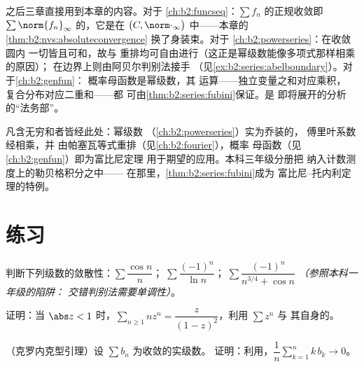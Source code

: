 \begin{remark}[本卷内的展望]\label{rem:b2:series:perspectives}
之后三章直接用到本章的内容。对于
\cref{ch:b2:funcseq}：$\sum f_n$ 的正规收敛即
$\sum\norm{f_n}_\infty$ 的，它是在
$\bigl(C, \norm\cdot_\infty\bigr)$ 中——本章的
\cref{thm:b2:nvs:absoluteconvergence} 换了身装束。对于
\cref{ch:b2:powerseries}：在收敛圆内
一切皆且可和，故与
重排均可自由进行（这正是幂级数能像多项式那样相乘的原因）；
在边界上则由阿贝尔判别法接手
（见\cref{ex:b2:series:abelboundary}）。对于\cref{ch:b2:genfun}：
概率母函数是幂级数，其
运算——独立变量之和对应乘积，
复合分布对应二重和——都
可由\cref{thm:b2:series:fubini}保证。是
即将展开的分析的“法务部”。
\end{remark}

\begin{remark}[本章的应用]
凡含无穷和者皆经此处：幂级数
（\cref{ch:b2:powerseries}）实为乔装的，
傅里叶系数经相乘，并
由帕塞瓦等式重排（见\cref{ch:b2:fourier}），概率
母函数（见\cref{ch:b2:genfun}）即为富比尼定理
用于期望的应用。本科三年级分册把
纳入计数测度上的勒贝格积分之中——
在那里，\cref{thm:b2:series:fubini}成为
富比尼–托内利定理的特例。
\end{remark}

\section{练习}

\begin{exercise}[$\star$]\label{exo:b2:series:1}
判断下列级数的敛散性：$\sum \dfrac{\cos n}{n}$；$\;\sum \dfrac{(-1)^n}{\ln
n}$；$\;\sum \dfrac{(-1)^n}{n^{3/4} + \cos n}$ \emph{（参照本科一年级的陷阱：
交错判别法需要单调性）}。
\end{exercise}

\begin{exercise}[$\star$]\label{exo:b2:series:2}
证明：当 $\abs z < 1$ 时，$\sum_{n\geq1} n z^{n} =
\dfrac{z}{(1-z)^2}$，利用 $\sum z^n$ 与
其自身的。
\end{exercise}

\begin{exercise}[$\star\star$]\label{exo:b2:series:3}
（克罗内克型引理）设 $\sum b_n$ 为收敛的实级数。
证明：利用，$\dfrac{1}{n}\sum_{k=1}^{n} k\,b_k
\to 0$。
\end{exercise}

